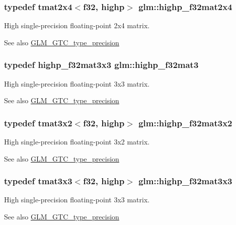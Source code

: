 \subsubsection[{highp\+\_\+f32mat2x4}]{\setlength{\rightskip}{0pt plus 5cm}typedef tmat2x4$<${\bf f32}, highp$>$ {\bf glm\+::highp\+\_\+f32mat2x4}}\label{namespaceglm_a33881add501a1c4b3a6a9706bc376310}
High single-\/precision floating-\/point 2x4 matrix. \begin{DoxySeeAlso}{See also}
\hyperlink{group__gtc__type__precision}{G\+L\+M\+\_\+\+G\+T\+C\+\_\+type\+\_\+precision} 
\end{DoxySeeAlso}
\hypertarget{namespaceglm_a06809818db73785334f839742a9ad85a}{}
\subsubsection[{highp\+\_\+f32mat3}]{\setlength{\rightskip}{0pt plus 5cm}typedef {\bf highp\+\_\+f32mat3x3} {\bf glm\+::highp\+\_\+f32mat3}}\label{namespaceglm_a06809818db73785334f839742a9ad85a}
High single-\/precision floating-\/point 3x3 matrix. \begin{DoxySeeAlso}{See also}
\hyperlink{group__gtc__type__precision}{G\+L\+M\+\_\+\+G\+T\+C\+\_\+type\+\_\+precision} 
\end{DoxySeeAlso}
\hypertarget{namespaceglm_a699e5b17f611aade662d1f0e45660150}{}
\subsubsection[{highp\+\_\+f32mat3x2}]{\setlength{\rightskip}{0pt plus 5cm}typedef tmat3x2$<${\bf f32}, highp$>$ {\bf glm\+::highp\+\_\+f32mat3x2}}\label{namespaceglm_a699e5b17f611aade662d1f0e45660150}
High single-\/precision floating-\/point 3x2 matrix. \begin{DoxySeeAlso}{See also}
\hyperlink{group__gtc__type__precision}{G\+L\+M\+\_\+\+G\+T\+C\+\_\+type\+\_\+precision} 
\end{DoxySeeAlso}
\hypertarget{namespaceglm_a54f70d88a2ef282af2dd5750f518645d}{}
\subsubsection[{highp\+\_\+f32mat3x3}]{\setlength{\rightskip}{0pt plus 5cm}typedef tmat3x3$<${\bf f32}, highp$>$ {\bf glm\+::highp\+\_\+f32mat3x3}}\label{namespaceglm_a54f70d88a2ef282af2dd5750f518645d}
High single-\/precision floating-\/point 3x3 matrix. \begin{DoxySeeAlso}{See also}
\hyperlink{group__gtc__type__precision}{G\+L\+M\+\_\+\+G\+T\+C\+\_\+type\+\_\+precision} 
\end{DoxySeeAlso}
\hypertarget{namespaceglm_a263a7304ad89c61bc70ede5ac2232ef3}{}
